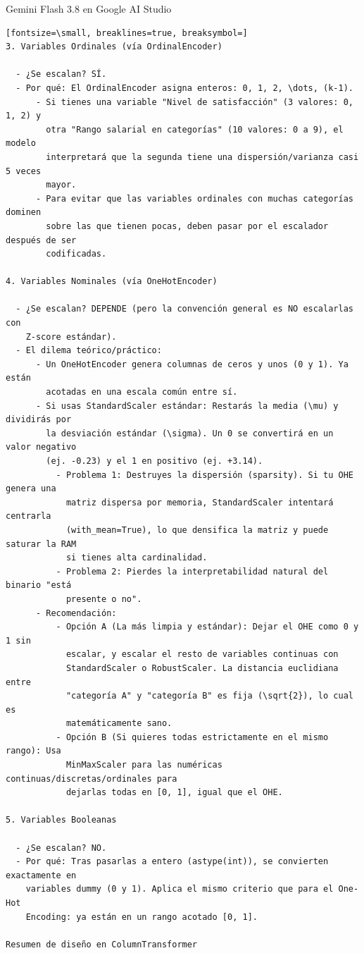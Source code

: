 \documentclass[12pt,a4paper,oneside]{book}
\begin{document}
\begin{iaresp}{Gemini Flash 3.8 en Google AI Studio}
\begin{Verbatim}[fontsize=\small, breaklines=true, breaksymbol=]
3. Variables Ordinales (vía OrdinalEncoder)

  - ¿Se escalan? SÍ.
  - Por qué: El OrdinalEncoder asigna enteros: 0, 1, 2, \dots, (k-1).
      - Si tienes una variable "Nivel de satisfacción" (3 valores: 0, 1, 2) y
        otra "Rango salarial en categorías" (10 valores: 0 a 9), el modelo
        interpretará que la segunda tiene una dispersión/varianza casi 5 veces
        mayor.
      - Para evitar que las variables ordinales con muchas categorías dominen
        sobre las que tienen pocas, deben pasar por el escalador después de ser
        codificadas.

4. Variables Nominales (vía OneHotEncoder)

  - ¿Se escalan? DEPENDE (pero la convención general es NO escalarlas con
    Z-score estándar).
  - El dilema teórico/práctico:
      - Un OneHotEncoder genera columnas de ceros y unos (0 y 1). Ya están
        acotadas en una escala común entre sí.
      - Si usas StandardScaler estándar: Restarás la media (\mu) y dividirás por
        la desviación estándar (\sigma). Un 0 se convertirá en un valor negativo
        (ej. -0.23) y el 1 en positivo (ej. +3.14).
          - Problema 1: Destruyes la dispersión (sparsity). Si tu OHE genera una
            matriz dispersa por memoria, StandardScaler intentará centrarla
            (with_mean=True), lo que densifica la matriz y puede saturar la RAM
            si tienes alta cardinalidad.
          - Problema 2: Pierdes la interpretabilidad natural del binario "está
            presente o no".
      - Recomendación:
          - Opción A (La más limpia y estándar): Dejar el OHE como 0 y 1 sin
            escalar, y escalar el resto de variables continuas con
            StandardScaler o RobustScaler. La distancia euclidiana entre
            "categoría A" y "categoría B" es fija (\sqrt{2}), lo cual es
            matemáticamente sano.
          - Opción B (Si quieres todas estrictamente en el mismo rango): Usa
            MinMaxScaler para las numéricas continuas/discretas/ordinales para
            dejarlas todas en [0, 1], igual que el OHE.

5. Variables Booleanas

  - ¿Se escalan? NO.
  - Por qué: Tras pasarlas a entero (astype(int)), se convierten exactamente en
    variables dummy (0 y 1). Aplica el mismo criterio que para el One-Hot
    Encoding: ya están en un rango acotado [0, 1].

Resumen de diseño en ColumnTransformer


\end{Verbatim}
\end{iaresp}
\end{document}
